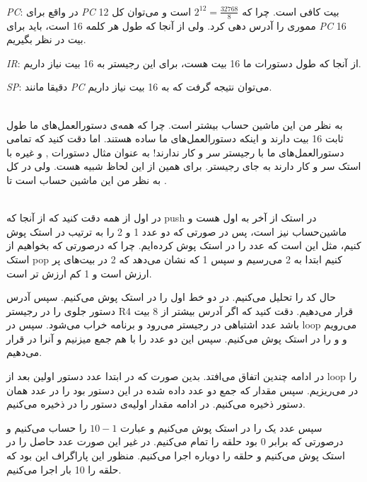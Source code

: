 \\
\linebreak
{}\\
\\
\emph{PC}:
در واقع برای
\emph{PC}
12
بیت کافی است. چرا که
$2^{12}=\frac{32768}{8}$
است و می‌توان کل مموری را آدرس دهی کرد. ولی از آنجا که طول هر کلمه 16 است، باید برای
\emph{PC}
16
بیت در نظر بگیریم.

\noindent
\emph{IR}:
از آنجا که طول دستورات ما 16 بیت هست، برای این رجیستر به 16 بیت نیاز داریم.

\noindent
\emph{SP}:
دقیقا مانند
\emph{PC}
می‌توان نتیجه گرفت که به 16 بیت نیاز داریم.

\\
به نظر من این ماشین حساب بیشتر
است. چرا که همه‌ی دستورالعمل‌های ما طول ثابت 16 بیت دارند و اینکه دستورالعمل‌های ما ساده هستند.
اما دقت کنید که تمامی دستورالعمل‌های ما با رجیستر سر و کار ندارند!
به عنوان مثال دستورات 
, 
و غیره با استک سر و کار دارند به جای رجیستر.
برای همین از این لحاظ شبیه
هست. ولی در کل به نظر من این ماشین حساب
است تا
.

\\
در اول از همه دقت کنید که از آنجا که
push
در استک از آخر به اول هست و ماشین‌حساب نیز
است، پس در صورتی که دو عدد 1 و 2 را به ترتیب در استک پوش کنیم، مثل این است که عدد
را در استک پوش کرده‌ایم. چرا که درصورتی که بخواهیم از استک
pop
کنیم ابتدا به 2 می‌رسیم و سپس 1 که نشان می‌دهد که 2 در بیت‌های پر ارزش است و 1 کم ارزش تر است.

\noindent
حال کد را تحلیل می‌کنیم.
در دو خط اول
را در استک پوش می‌کنیم.
سپس آدرس دستور جلوی 
را در رجیستر
R4
قرار می‌دهیم.
دقت کنید که اگر آدرس بیشتر از 8 بیت باشد عدد اشتباهی در رجیستر می‌رود و برنامه خراب می‌شود.
سپس در
loop
می‌رویم و
و
را در استک پوش می‌کنیم.
سپس این دو عدد را با هم جمع میزنیم و آنرا در 
قرار می‌دهیم.

\noindent
در ادامه چندین
اتفاق می‌افتد.
بدین صورت که در ابتدا عدد دستور اولین
بعد از 
loop
را در
می‌ریزیم.
سپس مقدار
که جمع دو عدد داده شده در این دستور بود را در عدد
همان دستور ذخیره می‌کنیم.
در ادامه مقدار اولیه‌ی دستور
را در
ذخیره می‌کنیم.

\noindent
سپس عدد یک را در استک پوش می‌کنیم و عبارت
$10-1$
را حساب می‌کنیم و درصورتی که برابر 0 بود حلقه را تمام می‌کنیم. در غیر این صورت عدد حاصل را در استک
پوش می‌کنیم و حلقه را دوباره اجرا می‌کنیم.
منظور این پاراگراف این بود که حلقه را 10 بار اجرا می‌کنیم.

